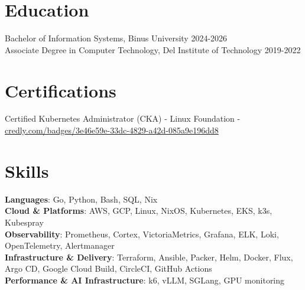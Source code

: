 \documentclass[10pt,a4paper]{article}
\begin{document}

\section*{Education}

Bachelor of Information Systems, Binus University \hfill 2024-2026\\
Associate Degree in Computer Technology, Del Institute of Technology \hfill 2019-2022



\section*{Certifications}

Certified Kubernetes Administrator (CKA) - Linux Foundation - \href{https://www.credly.com/badges/3e46e59e-33dc-4829-a42d-085a9e196dd8}{credly.com/badges/3e46e59e-33dc-4829-a42d-085a9e196dd8}


\section*{Skills}

\textbf{Languages}: Go, Python, Bash, SQL, Nix\\
\textbf{Cloud \& Platforms}: AWS, GCP, Linux, NixOS, Kubernetes, EKS, k3s, Kubespray\\
\textbf{Observability}: Prometheus, Cortex, VictoriaMetrics, Grafana, ELK, Loki, OpenTelemetry, Alertmanager\\
\textbf{Infrastructure \& Delivery}: Terraform, Ansible, Packer, Helm, Docker, Flux, Argo CD, Google Cloud Build, CircleCI, GitHub Actions\\
\textbf{Performance \& AI Infrastructure}: k6, vLLM, SGLang, GPU monitoring
\end{document}
